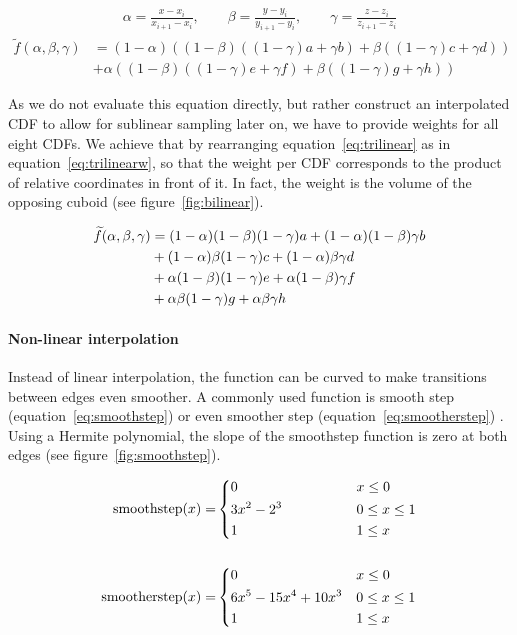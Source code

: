 \begin{align}
    \alpha = \frac{x-x_i}{x_{i+1}-x_i}, \qquad \beta = \frac{y-y_i}{y_{i+1}-y_i}, \qquad \gamma = \frac{z-z_i}{z_{i+1}-z_i}
\end{align}
\begin{align}\label{eq:trilinear}
    \widetilde{f}(\alpha, \beta, \gamma) &= (1-\alpha) ((1-\beta)((1-\gamma)a + \gamma b) + \beta ((1-\gamma) c + \gamma d)) \\
                         &+ \alpha ((1-\beta)((1-\gamma)e + \gamma f) + \beta ((1-\gamma) g + \gamma h))
\end{align}

As we do not evaluate this equation directly, but rather construct an interpolated CDF to allow for sublinear sampling later on, we have to provide weights for all eight CDFs. We achieve that by rearranging equation~\ref{eq:trilinear} as in equation~\ref{eq:trilinearw}, so that the weight per CDF corresponds to the product of relative coordinates in front of it. In fact, the weight is the volume of the opposing cuboid (see figure~\ref{fig:bilinear}).


\begin{align}\label{eq:trilinearw}
    \widetilde{f}(\alpha, \beta, \gamma) &= (1-\alpha)(1-\beta)(1-\gamma)a + (1-\alpha)(1-\beta)\gamma b  \notag \\
    &+ (1-\alpha)\beta(1-\gamma)c  + (1-\alpha)\beta\gamma d \\
    &+ \alpha(1-\beta)(1-\gamma)e + \alpha(1-\beta)\gamma f \notag \\
    &+ \alpha\beta(1-\gamma) g + \alpha\beta\gamma h \notag
\end{align}

\paragraph{Non-linear interpolation}
Instead of linear interpolation, the function can be curved to make transitions between edges even smoother. A commonly used function is smooth step (equation~\ref{eq:smoothstep}) or even smoother step (equation~\ref{eq:smootherstep}) \parencite{ebert2003texturing}. Using a Hermite polynomial, the slope of the smoothstep function is zero at both edges (see figure~\ref{fig:smoothstep}).

\begin{align}
    \text{smoothstep}(x) =& 
    \begin{dcases}
        0& x \leq 0\\
        3x^2 - 2^3 \qquad \qquad ~& 0 \leq x \leq 1 \\
        1& 1 \leq x
    \end{dcases} \label{eq:smoothstep} \\ \notag
    \\ 
    \text{smootherstep}(x) =&
    \begin{dcases}
        0& x \leq 0\\
        6x^5 - 15x^4 + 10x^3& 0 \leq x \leq 1 \\
        1& 1 \leq x
    \end{dcases}
    \label{eq:smootherstep}
\end{align}

